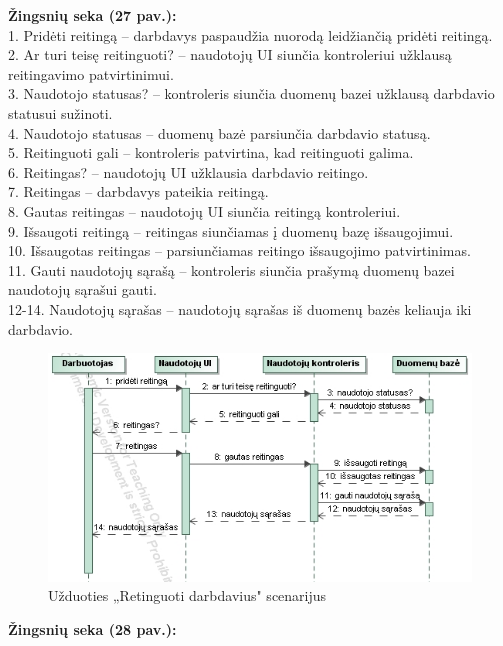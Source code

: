 \documentclass{VUMIFPSkursinis}
\begin{document}
	\textbf{Žingsnių seka (27 pav.):}\\
	1. Pridėti reitingą – darbdavys paspaudžia nuorodą leidžiančią pridėti reitingą.\\
	2. Ar turi teisę reitinguoti? – naudotojų UI siunčia kontroleriui užklausą reitingavimo patvirtinimui.\\
	3. Naudotojo statusas? – kontroleris siunčia duomenų bazei užklausą darbdavio statusui sužinoti.\\
	4. Naudotojo statusas – duomenų bazė parsiunčia darbdavio statusą.\\
	5. Reitinguoti gali – kontroleris patvirtina, kad reitinguoti galima.\\
	6. Reitingas? – naudotojų UI užklausia darbdavio reitingo.\\
	7. Reitingas – darbdavys pateikia reitingą.\\
	8. Gautas reitingas – naudotojų UI siunčia reitingą kontroleriui.\\
	9. Išsaugoti reitingą – reitingas siunčiamas į duomenų bazę išsaugojimui.\\
	10. Išsaugotas reitingas – parsiunčiamas reitingo išsaugojimo patvirtinimas.\\
	11. Gauti naudotojų sąrašą – kontroleris siunčia prašymą duomenų bazei naudotojų sąrašui gauti.\\
	12-14. Naudotojų sąrašas – naudotojų sąrašas iš duomenų bazės keliauja iki darbdavio.\\
%
\begin{figure}[H]
\centering
\includegraphics[width=\linewidth, frame]{img/seku(reitinguotidarbdavi).png}
\caption{Užduoties „Retinguoti darbdavius" scenarijus}
\end{figure}
	\textbf{Žingsnių seka (28 pav.):}\\
\end{document}
